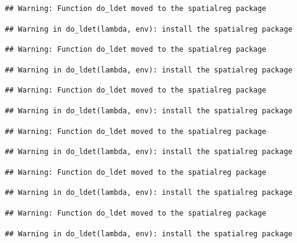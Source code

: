 \documentclass[]{book}
\begin{document}
\begin{verbatim}
## Warning: Function do_ldet moved to the spatialreg package
\end{verbatim}

\begin{verbatim}
## Warning in do_ldet(lambda, env): install the spatialreg package
\end{verbatim}

\begin{verbatim}
## Warning: Function do_ldet moved to the spatialreg package
\end{verbatim}

\begin{verbatim}
## Warning in do_ldet(lambda, env): install the spatialreg package
\end{verbatim}

\begin{verbatim}
## Warning: Function do_ldet moved to the spatialreg package
\end{verbatim}

\begin{verbatim}
## Warning in do_ldet(lambda, env): install the spatialreg package
\end{verbatim}

\begin{verbatim}
## Warning: Function do_ldet moved to the spatialreg package
\end{verbatim}

\begin{verbatim}
## Warning in do_ldet(lambda, env): install the spatialreg package
\end{verbatim}

\begin{verbatim}
## Warning: Function do_ldet moved to the spatialreg package
\end{verbatim}

\begin{verbatim}
## Warning in do_ldet(lambda, env): install the spatialreg package
\end{verbatim}

\begin{verbatim}
## Warning: Function do_ldet moved to the spatialreg package
\end{verbatim}

\begin{verbatim}
## Warning in do_ldet(lambda, env): install the spatialreg package
\end{verbatim}
\end{document}
